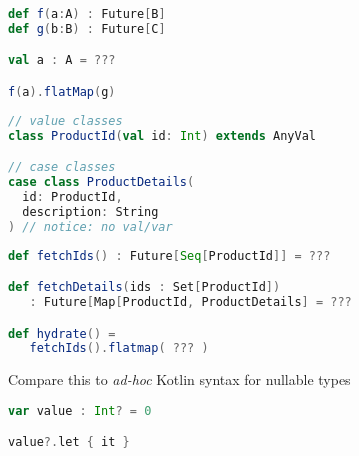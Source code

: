 \documentclass[10pt]{beamer}
\begin{document}
\begin{frame}[fragile]
\begin{lstlisting}[language=Scala, basicstyle=\ttfamily]
def f(a:A) : Future[B]
def g(b:B) : Future[C]

val a : A = ???

f(a).flatMap(g)
\end{lstlisting}
\end{frame}
\begin{frame}[fragile]
\begin{lstlisting}[language=Scala, basicstyle=\ttfamily]
// value classes 
class ProductId(val id: Int) extends AnyVal 

// case classes 
case class ProductDetails(
  id: ProductId,
  description: String
) // notice: no val/var 
\end{lstlisting}
\end{frame}


\begin{frame}[fragile]
\begin{lstlisting}[language=Scala, basicstyle=\ttfamily]
def fetchIds() : Future[Seq[ProductId]] = ???

def fetchDetails(ids : Set[ProductId]) 
   : Future[Map[ProductId, ProductDetails] = ???

def hydrate() = 
   fetchIds().flatmap( ??? )

\end{lstlisting}
\end{frame}

\begin{frame}[fragile]
Compare this to \emph{ad-hoc} Kotlin syntax for nullable types 
\begin{lstlisting}[language=Scala, basicstyle=\ttfamily]
var value : Int? = 0

value?.let { it }
\end{lstlisting}
\end{frame}






\end{document}
